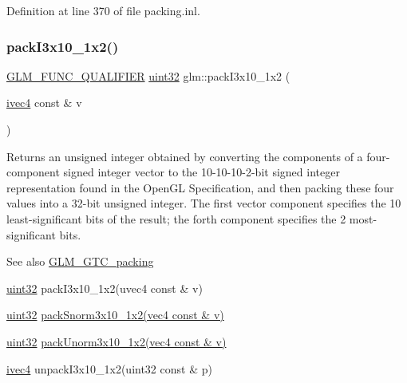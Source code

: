 Definition at line 370 of file packing.\+inl.

\mbox{\label{group__gtc__packing_ga032e18fa5bc5b8f3897104aeb2f1e195}} 
\subsubsection{\texorpdfstring{pack\+I3x10\+\_\+1x2()}{packI3x10\_1x2()}}
{\footnotesize\ttfamily \hyperlink{setup_8hpp_a33fdea6f91c5f834105f7415e2a64407}{G\+L\+M\+\_\+\+F\+U\+N\+C\+\_\+\+Q\+U\+A\+L\+I\+F\+I\+ER} \hyperlink{group__gtc__type__precision_ga202b6a53c105fcb7e531f9b443518451}{uint32} glm\+::pack\+I3x10\+\_\+1x2 (\begin{DoxyParamCaption}\item[{\hyperlink{group__core__types_gaa4560ddc50320ea8f8a70d5c9c249fea}{ivec4} const \&}]{v }\end{DoxyParamCaption})}

Returns an unsigned integer obtained by converting the components of a four-\/component signed integer vector to the 10-\/10-\/10-\/2-\/bit signed integer representation found in the Open\+GL Specification, and then packing these four values into a 32-\/bit unsigned integer. The first vector component specifies the 10 least-\/significant bits of the result; the forth component specifies the 2 most-\/significant bits.

\begin{DoxySeeAlso}{See also}
\hyperlink{group__gtc__packing}{G\+L\+M\+\_\+\+G\+T\+C\+\_\+packing} 

\hyperlink{group__gtc__type__precision_ga202b6a53c105fcb7e531f9b443518451}{uint32} pack\+I3x10\+\_\+1x2(uvec4 const \& v) 

\hyperlink{group__gtc__type__precision_ga202b6a53c105fcb7e531f9b443518451}{uint32} \hyperlink{group__gtc__packing_ga0d4157cec37c0312216a7be1cc92df54}{pack\+Snorm3x10\+\_\+1x2(vec4 const \& v)} 

\hyperlink{group__gtc__type__precision_ga202b6a53c105fcb7e531f9b443518451}{uint32} \hyperlink{group__gtc__packing_ga2cf2d11b40bd48639110456fd74c2e33}{pack\+Unorm3x10\+\_\+1x2(vec4 const \& v)} 

\hyperlink{group__core__types_gaa4560ddc50320ea8f8a70d5c9c249fea}{ivec4} unpack\+I3x10\+\_\+1x2(uint32 const \& p) 
\end{DoxySeeAlso}


